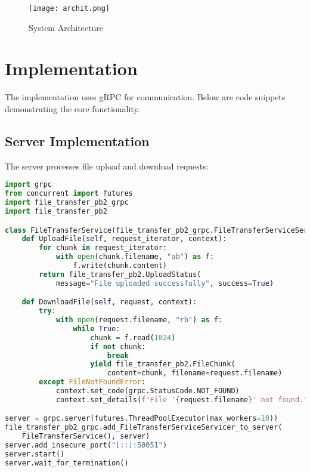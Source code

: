 \documentclass{article}
\begin{document}
\begin{figure}[h!]
\centering
\texttt{[image: archit.png]}  
\caption{System Architecture}
\end{figure}

\section*{Implementation}
The implementation uses gRPC for communication. Below are code snippets demonstrating the core functionality.

\subsection*{Server Implementation}
The server processes file upload and download requests:
\begin{lstlisting}[language=python, caption={Server Implementation}, frame=single]
import grpc
from concurrent import futures
import file_transfer_pb2_grpc
import file_transfer_pb2

class FileTransferService(file_transfer_pb2_grpc.FileTransferServiceServicer):
    def UploadFile(self, request_iterator, context):
        for chunk in request_iterator:
            with open(chunk.filename, "ab") as f:
                f.write(chunk.content)
        return file_transfer_pb2.UploadStatus(
            message="File uploaded successfully", success=True)

    def DownloadFile(self, request, context):
        try:
            with open(request.filename, "rb") as f:
                while True:
                    chunk = f.read(1024)
                    if not chunk:
                        break
                    yield file_transfer_pb2.FileChunk(
                        content=chunk, filename=request.filename)
        except FileNotFoundError:
            context.set_code(grpc.StatusCode.NOT_FOUND)
            context.set_details(f"File '{request.filename}' not found.")

server = grpc.server(futures.ThreadPoolExecutor(max_workers=10))
file_transfer_pb2_grpc.add_FileTransferServiceServicer_to_server(
    FileTransferService(), server)
server.add_insecure_port("[::]:50051")
server.start()
server.wait_for_termination()
\end{lstlisting}
\end{document}
